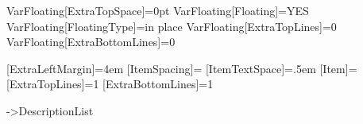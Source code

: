 {%
\SetEnviParam VarFloating[ExtraTopSpace]={0pt}
\SetEnviParam VarFloating[Floating]={YES}
\SetEnviParam VarFloating[FloatingType]={in place} %
\SetEnviParam VarFloating[ExtraTopLines]={0}
\SetEnviParam VarFloating[ExtraBottomLines]={0}



\def\ParedItem#1{\par\indent\llap{#1\kern\GetCurrEnviParam[ItemTextSpace]}\ignorespaces}

\def\BulletItem{\ParedItem{\GetCurrEnviParam[BulletSign]}}%

\def\NumItem{%
	\IncrementCounter{\GetCurrEnviParam[Counter]}%
	\par\indent\llap{\GetCurrEnviParam[NumberProcessor]{\GetCounter{\GetCurrEnviParam[Counter]}}%
	\GetCurrEnviParam[Separator]\kern\GetCurrEnviParam[ItemTextSpace]}\ignorespaces}%

\def\ExcsdPar#1{%
	\advance\parindent by-#1%
	\par%
	\def\par{\endgraf%
		\advance\parindent by#1%
		\let\par\endgraf}}%

\def\DescItem#1{\ExcsdPar{\GetCurrEnviParam[ItemExcess]}\Bold{#1}\GetCurrEnviParam[Separator]\ignorespaces}%


%
	{}%

[ExtraLeftMargin]={4em}%
[ItemSpacing]={\GetDocParam[HardLineSkip]}%
[ItemTextSpace]={.5em}%
[Item]={}%
[ExtraTopLines]={1}%
[ExtraBottomLines]={1}%


->{DescriptionList}%

}
